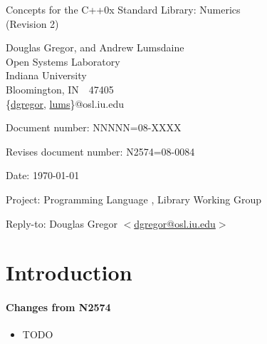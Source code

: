 \documentclass[american,twoside]{book}
\begin{document}
\raggedbottom

\begin{titlepage}
\begin{center}
\huge
Concepts for the C++0x Standard Library: Numerics\\
(Revision 2)

\vspace{0.5in}

\normalsize
Douglas Gregor, and Andrew Lumsdaine \\
Open Systems Laboratory \\
Indiana University \\
Bloomington, IN\ \  47405 \\
\{\href{mailto:dgregor@osl.iu.edu}{dgregor}, \href{mailto:lums@osl.iu.edu}{lums}\}@osl.iu.edu
\end{center}

\vspace{1in}
\par\noindent Document number: NNNNN=08-XXXX\vspace{-6pt}
\par\noindent Revises document number: N2574=08-0084\vspace{-6pt}
\par\noindent Date: \today\vspace{-6pt}
\par\noindent Project: Programming Language \Cpp{}, Library Working Group\vspace{-6pt}
\par\noindent Reply-to: Douglas Gregor $<$\href{mailto:dgregor@osl.iu.edu}{dgregor@osl.iu.edu}$>$\vspace{-6pt}

\section*{Introduction}

\paragraph*{Changes from N2574}
\begin{itemize}
\item TODO
\end{itemize}

\end{titlepage}

\pagestyle{fancy}
\fancyhead[LE,RO]{\textbf{\rightmark}}
\fancyhead[RE]{\textbf{\leftmark\hspace{1em}\thepage}}
\fancyhead[LO]{\textbf{\thepage\hspace{1em}\leftmark}}
\end{document}
